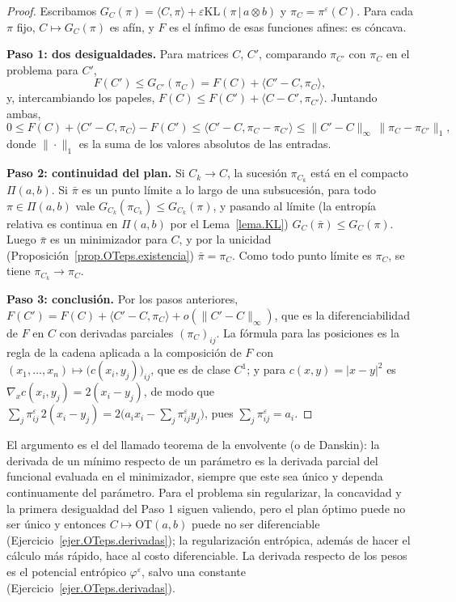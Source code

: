 \documentclass[12pt, a4paper]{amsbook}
\theoremstyle{remark}
\theoremstyle{definition}
\numberwithin{section}{chapter}
\numberwithin{subsection}{section}
\numberwithin{equation}{section}
\numberwithin{figure}{chapter}
\begin{document}
\begin{proof}
Escribamos $G_C(\pi)=\langle C,\pi\rangle+\varepsilon\mathrm{KL}(\pi\,|\,a\otimes b)$
y $\pi_C=\pi^\varepsilon(C)$. Para cada $\pi$ fijo, $C\mapsto G_C(\pi)$ es
afín, y $F$ es el ínfimo de esas funciones afines: es cóncava.

\medskip
\textbf{Paso 1: dos desigualdades.} Para matrices $C$, $C'$, comparando
$\pi_{C'}$ con $\pi_C$ en el problema para $C'$,
\[
F(C')\le G_{C'}(\pi_C)=F(C)+\langle C'-C,\pi_C\rangle,
\]
y, intercambiando los papeles,
$F(C)\le F(C')+\langle C-C',\pi_{C'}\rangle$. Juntando ambas,
\[
0\le F(C)+\langle C'-C,\pi_C\rangle-F(C')
\le\langle C'-C,\pi_C-\pi_{C'}\rangle
\le\|C'-C\|_\infty\,\|\pi_C-\pi_{C'}\|_1,
\]
donde $\|\cdot\|_1$ es la suma de los valores absolutos de las entradas.

\medskip
\textbf{Paso 2: continuidad del plan.} Si $C_k\to C$, la sucesión
$\pi_{C_k}$ está en el compacto $\Pi(a,b)$. Si $\bar\pi$ es un punto límite
a lo largo de una subsucesión, para todo $\pi\in\Pi(a,b)$ vale
$G_{C_k}(\pi_{C_k})\le G_{C_k}(\pi)$, y pasando al límite (la entropía
relativa es continua en $\Pi(a,b)$ por el Lema~\ref{lema.KL})
$G_C(\bar\pi)\le G_C(\pi)$. Luego $\bar\pi$ es un minimizador para $C$, y
por la unicidad (Proposición~\ref{prop.OTeps.existencia}) $\bar\pi=\pi_C$.
Como todo punto límite es $\pi_C$, se tiene $\pi_{C_k}\to\pi_C$.

\medskip
\textbf{Paso 3: conclusión.} Por los pasos anteriores,
$F(C')=F(C)+\langle C'-C,\pi_C\rangle+o(\|C'-C\|_\infty)$, que es la
diferenciabilidad de $F$ en $C$ con derivadas parciales $(\pi_C)_{ij}$. La
fórmula para las posiciones es la regla de la cadena aplicada a la
composición de $F$ con $(x_1,\dots,x_n)\mapsto\bigl(c(x_i,y_j)\bigr)_{ij}$,
que es de clase $C^1$; y para $c(x,y)=|x-y|^2$ es
$\nabla_xc(x_i,y_j)=2(x_i-y_j)$, de modo que
$\sum_j\pi^\varepsilon_{ij}\,2(x_i-y_j)=2\bigl(a_ix_i-\sum_j\pi^\varepsilon_{ij}y_j\bigr)$,
pues $\sum_j\pi^\varepsilon_{ij}=a_i$.
\end{proof}

El argumento es el del llamado teorema de la envolvente (o de Danskin): la
derivada de un mínimo respecto de un parámetro es la derivada parcial del
funcional evaluada en el minimizador, siempre que este sea único y dependa
continuamente del parámetro. Para el problema sin regularizar, la
concavidad y la primera desigualdad del Paso 1 siguen valiendo, pero el plan
óptimo puede no ser único y entonces $C\mapsto\mathrm{OT}(a,b)$ puede no ser
diferenciable (Ejercicio~\ref{ejer.OTeps.derivadas}); la regularización
entrópica, además de hacer el cálculo más rápido, hace al costo
diferenciable. La derivada respecto de los pesos es el potencial entrópico
$\varphi^\varepsilon$, salvo una constante (Ejercicio~\ref{ejer.OTeps.derivadas}).
\end{document}
